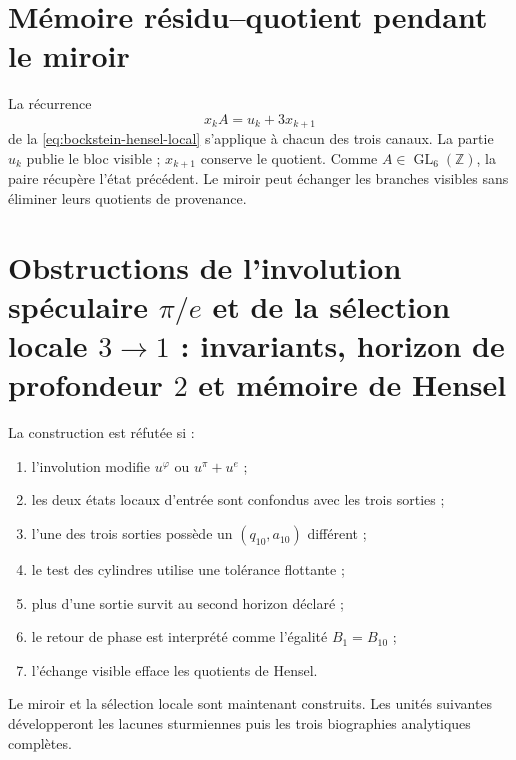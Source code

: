 \section{Mémoire résidu--quotient pendant le miroir}

La récurrence
\[
 x_kA=u_k+3x_{k+1}
\]
de la \cref{eq:bockstein-hensel-local} s'applique à chacun des trois
canaux. La partie \(u_k\) publie le bloc visible ; \(x_{k+1}\) conserve
le quotient. Comme \(A\in\operatorname{GL}_6(\mathbb Z)\), la paire récupère
l'état précédent. Le miroir peut échanger les branches visibles sans
éliminer leurs quotients de provenance.

\section{Obstructions de l'involution spéculaire \(\pi/e\) et de la sélection locale \(3\to1\) : invariants, horizon de profondeur \(2\) et mémoire de Hensel}

\begin{criterion}
La construction est réfutée si :
\begin{enumerate}
 \item l'involution modifie \(u^\varphi\) ou \(u^\pi+u^e\) ;
 \item les deux états locaux d'entrée sont confondus avec les trois sorties ;
 \item l'une des trois sorties possède un \((q_{10},a_{10})\) différent ;
 \item le test des cylindres utilise une tolérance flottante ;
 \item plus d'une sortie survit au second horizon déclaré ;
 \item le retour de phase est interprété comme l'égalité \(B_1=B_{10}\) ;
 \item l'échange visible efface les quotients de Hensel.
\end{enumerate}
\end{criterion}

Le miroir et la sélection locale sont maintenant construits. Les unités
suivantes développeront les lacunes sturmiennes puis les trois
biographies analytiques complètes.
